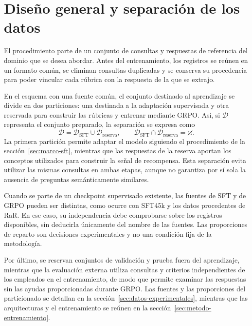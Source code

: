 \section{Diseño general y separación de los datos}
\label{sec:metodo-datos}
El procedimiento parte de un conjunto de consultas y respuestas de referencia del dominio que se desea abordar. Antes del entrenamiento, los registros se reúnen en un formato común, se eliminan consultas duplicadas y se conserva su procedencia para poder vincular cada rúbrica con la respuesta de la que se extrajo.

En el esquema con una fuente común, el conjunto destinado al aprendizaje se divide en dos particiones: una destinada a la adaptación supervisada y otra reservada para construir las rúbricas y entrenar mediante GRPO. Así, si $\mathcal{D}$ representa el conjunto preparado, la separación se expresa como
\begin{equation}
\mathcal{D}=\mathcal{D}_{\mathrm{SFT}}\cup\mathcal{D}_{\mathrm{reserva}},
\qquad
\mathcal{D}_{\mathrm{SFT}}\cap\mathcal{D}_{\mathrm{reserva}}=\varnothing.
\label{eq:metodo-separacion}
\end{equation}
La primera partición permite adaptar el modelo siguiendo el procedimiento de la sección~\ref{sec:marco-sft}, mientras que las respuestas de la reserva aportan los conceptos utilizados para construir la señal de recompensa. Esta separación evita utilizar las mismas consultas en ambas etapas, aunque no garantiza por sí sola la ausencia de preguntas semánticamente similares.

Cuando se parte de un checkpoint supervisado existente, las fuentes de SFT y de GRPO pueden ser distintas, como ocurre con SFT45k y los datos procedentes de RaR. En ese caso, su independencia debe comprobarse sobre los registros disponibles, sin deducirla únicamente del nombre de las fuentes. Las proporciones de reparto son decisiones experimentales y no una condición fija de la metodología.

Por último, se reservan conjuntos de validación y prueba fuera del aprendizaje, mientras que la evaluación externa utiliza consultas y criterios independientes de los empleados en el entrenamiento, de modo que permite examinar las respuestas sin las ayudas proporcionadas durante GRPO. Las fuentes y las proporciones del particionado se detallan en la sección~\ref{sec:datos-experimentales}, mientras que las arquitecturas y el entrenamiento se reúnen en la sección~\ref{sec:metodo-entrenamiento}.
